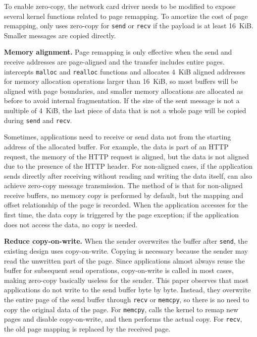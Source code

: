 
To enable zero-copy, the network card driver needs to be modified to expose several kernel functions related to page remapping. To amortize the cost of page remapping, \libipc{} only uses zero-copy for \texttt{send} or \texttt{recv} if the payload is at least 16~KiB. Smaller messages are copied directly.

\textbf{Memory alignment.} Page remapping is only effective when the send and receive addresses are page-aligned and the transfer includes entire pages. \libipc{} intercepts \texttt{malloc} and \texttt{realloc} functions and allocates 4~KiB aligned addresses for memory allocation operations larger than 16~KiB, so most buffers will be aligned with page boundaries, and smaller memory allocations are allocated as before to avoid internal fragmentation. If the size of the sent message is not a multiple of 4~KiB, the last piece of data that is not a whole page will be copied during \texttt{send} and \texttt{recv}.

Sometimes, applications need to receive or send data not from the starting address of the allocated buffer. For example, the data is part of an HTTP request, the memory of the HTTP request is aligned, but the data is not aligned due to the presence of the HTTP header. For non-aligned cases, if the application sends directly after receiving without reading and writing the data itself, \sys{} can also achieve zero-copy message transmission. The method of \sys{} is that for non-aligned receive buffers, no memory copy is performed by default, but the mapping and offset relationship of the page is recorded. When the application accesses for the first time, the data copy is triggered by the page exception; if the application does not access the data, no copy is needed.


\textbf{Reduce copy-on-write.} When the sender overwrites the buffer after \texttt{send}, the existing design uses copy-on-write. Copying is necessary because the sender may read the unwritten part of the page. Since applications almost always reuse the buffer for subsequent send operations, copy-on-write is called in most cases, making zero-copy basically useless for the sender. This paper observes that most applications do not write to the send buffer byte by byte. Instead, they overwrite the entire page of the send buffer through \texttt{recv} or \texttt{memcpy}, so there is no need to copy the original data of the page. For \texttt{memcpy}, \libipc{} calls the kernel to remap new pages and disable copy-on-write, and then performs the actual copy. For \texttt{recv}, the old page mapping is replaced by the received page.


